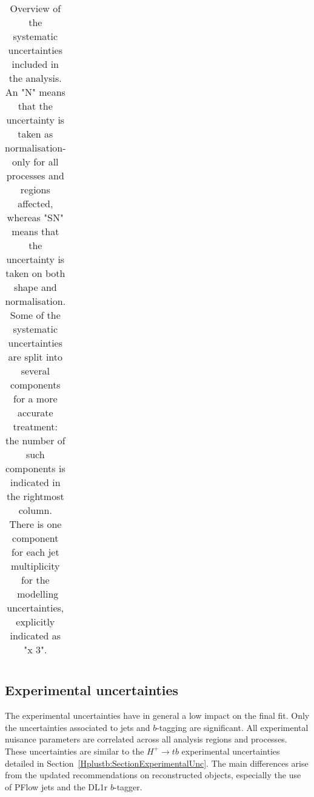 \begin{table}[htbp]
\begin{tabular}{lcc}
  \bottomrule
  \bottomrule
  \end{tabular}
  \caption{
  Overview of the systematic uncertainties included in the analysis.
  An "N" means that the uncertainty is taken as normalisation-only for all processes and regions affected,  whereas "SN" means that the uncertainty is taken on both shape and normalisation. Some of the systematic uncertainties are split into several components for a more accurate treatment: the number of such components is indicated in the rightmost column. There is one component for each jet multiplicity for the \ttbar\ modelling uncertainties, explicitly indicated as "x 3".
  }
  \label{tqX:tablesys}
\end{table}

\subsection{Experimental uncertainties}
The experimental uncertainties have in general a low impact on the final fit. Only the uncertainties associated to jets and $b$-tagging are significant. All experimental nuisance parameters are correlated across all analysis regions and processes. These uncertainties are similar to the $H^+\to tb$ experimental uncertainties detailed in Section~\ref{Hplustb:SectionExperimentalUnc}. The main differences arise from the updated recommendations on reconstructed objects, especially the use of PFlow jets and the DL1r $b$-tagger.\\



